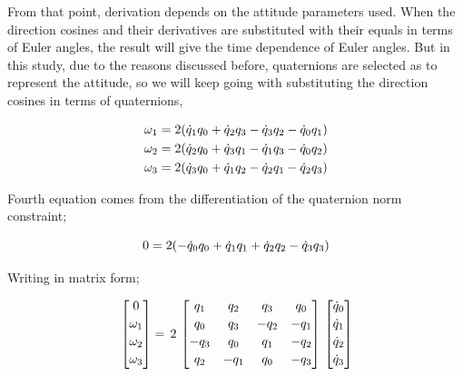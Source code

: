 From that point, derivation depends on the attitude parameters used. 
When the direction cosines and their derivatives are substituted with 
their equals in terms of Euler angles, the result will give the time 
dependence of Euler angles. But in this study, due to the reasons 
discussed before, quaternions are selected as to represent the attitude, 
so we will keep going with substituting the direction cosines in terms of quaternions,

\begin{align}{\label{eqn:angVelocityQuaternion}}
\begin{split}
\omega_1 & = 2 (\dot{q}_1 q_0 + \dot{q}_2 q_3 - \dot{q}_3 q_2 - \dot{q}_0 q_1) \\
\omega_2 & = 2 (\dot{q}_2 q_0 + \dot{q}_3 q_1 - \dot{q}_1 q_3 - \dot{q}_0 q_2) \\
\omega_3 & = 2 (\dot{q}_3 q_0 + \dot{q}_1 q_2 - \dot{q}_2 q_1 - \dot{q}_2 q_3)\\
\end{split}
\end{align}

Fourth equation comes from the differentiation of the quaternion norm constraint;

\begin{equation}{\label{eqn:kinematicEquDQM}}
0 = 2 (- \dot{q}_0 q_0 + \dot{q}_1 q_1 + \dot{q}_2 q_2 - \dot{q}_3 q_3)
\end{equation}

Writing in matrix form;

\begin{equation}{\label{eqn:kinematicEquAngVel}}
\begin{bmatrix}
0\\[0.2em]
\omega_1\\[0.2em]
\omega_2\\[0.2em]
\omega_3\\[0.2em]
\end{bmatrix}
 =\,
 2\,
\begin{bmatrix}
q_1 & q_2 & q_3 & q_0 \\[0.2em]
q_0 & q_3 & -q_2 & -q_1 \\[0.2em]
-q_3 & q_0 & q_1 & -q_2 \\[0.2em]
q_2 & -q_1 & q_0 & -q_3 \\[0.2em]
\end{bmatrix}
\,
\begin{bmatrix}
\dot{q}_0\\[0.2em]
\dot{q}_1\\[0.2em]
\dot{q}_2\\[0.2em]
\dot{q}_3\\[0.2em]
\end{bmatrix}
\end{equation}
 
